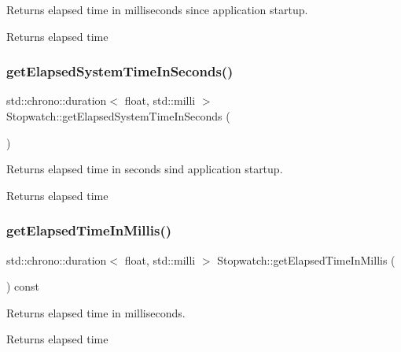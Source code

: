 Returns elapsed time in milliseconds since application startup. 

\begin{DoxyReturn}{Returns}
elapsed time 
\end{DoxyReturn}
\mbox{\label{class_stopwatch_a15494cf73d00c146c5151e348d9a5326}} 
\subsubsection{\texorpdfstring{getElapsedSystemTimeInSeconds()}{getElapsedSystemTimeInSeconds()}}
{\footnotesize\ttfamily std\+::chrono\+::duration$<$ float, std\+::milli $>$ Stopwatch\+::get\+Elapsed\+System\+Time\+In\+Seconds (\begin{DoxyParamCaption}{ }\end{DoxyParamCaption})\hspace{0.3cm}{\ttfamily [static]}}



Returns elapsed time in seconds sind application startup. 

\begin{DoxyReturn}{Returns}
elapsed time 
\end{DoxyReturn}
\mbox{\label{class_stopwatch_a5d69cdef517efa260d22218ffc2646d3}} 
\subsubsection{\texorpdfstring{getElapsedTimeInMillis()}{getElapsedTimeInMillis()}}
{\footnotesize\ttfamily std\+::chrono\+::duration$<$ float, std\+::milli $>$ Stopwatch\+::get\+Elapsed\+Time\+In\+Millis (\begin{DoxyParamCaption}{ }\end{DoxyParamCaption}) const}



Returns elapsed time in milliseconds. 

\begin{DoxyReturn}{Returns}
elapsed time 
\end{DoxyReturn}
\mbox{\label{class_stopwatch_a8fd9786f99abeb8289ba235d0e47cf26}} 
